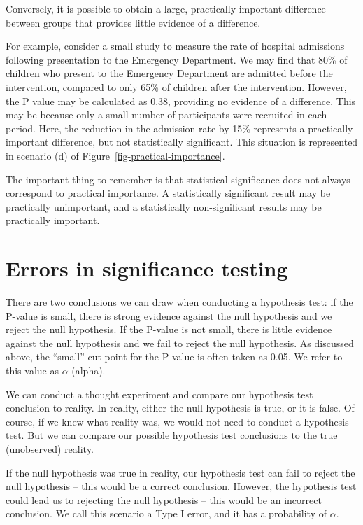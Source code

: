 \documentclass[
  a4paper,
]{memoir}
\begin{document}
Conversely, it is possible to obtain a large, practically important
difference between groups that provides little evidence of a difference.

For example, consider a small study to measure the rate of hospital
admissions following presentation to the Emergency Department. We may
find that 80\% of children who present to the Emergency Department are
admitted before the intervention, compared to only 65\% of children
after the intervention. However, the P value may be calculated as 0.38,
providing no evidence of a difference. This may be because only a small
number of participants were recruited in each period. Here, the
reduction in the admission rate by 15\% represents a practically
important difference, but not statistically significant. This situation
is represented in scenario (d) of Figure~\ref{fig-practical-importance}.

The important thing to remember is that statistical significance does
not always correspond to practical importance. A statistically
significant result may be practically unimportant, and a statistically
non-significant results may be practically important.

\section{Errors in significance
testing}\label{errors-in-significance-testing}

There are two conclusions we can draw when conducting a hypothesis test:
if the P-value is small, there is strong evidence against the null
hypothesis and we reject the null hypothesis. If the P-value is not
small, there is little evidence against the null hypothesis and we fail
to reject the null hypothesis. As discussed above, the ``small''
cut-point for the P-value is often taken as 0.05. We refer to this value
as \(\alpha\) (alpha).

We can conduct a thought experiment and compare our hypothesis test
conclusion to reality. In reality, either the null hypothesis is true,
or it is false. Of course, if we knew what reality was, we would not
need to conduct a hypothesis test. But we can compare our possible
hypothesis test conclusions to the true (unobserved) reality.

If the null hypothesis was true in reality, our hypothesis test can fail
to reject the null hypothesis -- this would be a correct conclusion.
However, the hypothesis test could lead us to rejecting the null
hypothesis -- this would be an incorrect conclusion. We call this
scenario a Type I error, and it has a probability of \(\alpha\).
\end{document}
